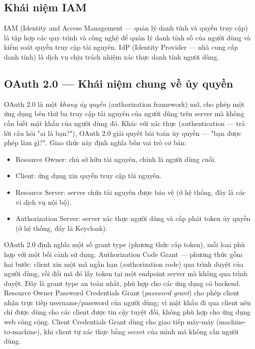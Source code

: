 \documentclass[../BTL.tex]{subfiles}
\begin{document}
\subsection{Khái niệm IAM}
\label{section:2.8.1}

IAM (Identity and Access Management --- quản lý danh tính và quyền truy cập) là tập hợp các quy trình và công nghệ để quản lý danh tính số của người dùng và kiểm soát quyền truy cập tài nguyên. IdP (Identity Provider --- nhà cung cấp danh tính) là dịch vụ chịu trách nhiệm xác thực danh tính người dùng.

\subsection{OAuth 2.0 — Khái niệm chung về ủy quyền}
\label{section:2.8.2}

OAuth 2.0 là một \textit{khung ủy quyền} (authorization framework) mở, cho phép một ứng dụng bên thứ ba truy cập tài nguyên của người dùng trên server mà không cần biết mật khẩu của người dùng đó. Khác với xác thực (authentication — trả lời câu hỏi "ai là bạn?"), OAuth 2.0 giải quyết bài toán ủy quyền — "bạn được phép làm gì?". Giao thức này định nghĩa bốn vai trò cơ bản:

\begin{itemize}
    \item Resource Owner: chủ sở hữu tài nguyên, chính là người dùng cuối.
    \item Client: ứng dụng xin quyền truy cập tài nguyên.
    \item Resource Server: server chứa tài nguyên được bảo vệ (ở hệ thống, đây là các vi dịch vụ nội bộ).
    \item Authorization Server: server xác thực người dùng và cấp phát token ủy quyền (ở hệ thống, đây là Keycloak).
\end{itemize}

OAuth 2.0 định nghĩa một số grant type (phương thức cấp token), mỗi loại phù hợp với một bối cảnh sử dụng. Authorization Code Grant — phương thức gồm hai bước: client xin một mã ngắn hạn (authorization code) qua trình duyệt của người dùng, rồi đổi mã đó lấy token tại một endpoint server mà không qua trình duyệt. Đây là grant type an toàn nhất, phù hợp cho các ứng dụng có backend. Resource Owner Password Credentials Grant (\textit{password grant}) cho phép client nhận trực tiếp username/password của người dùng; vì mật khẩu đi qua client nên chỉ được dùng cho các client được tin cậy tuyệt đối, không phù hợp cho ứng dụng web công cộng. Client Credentials Grant dùng cho giao tiếp máy-máy (machine-to-machine), khi client tự xác thực bằng secret của mình mà không cần người dùng.
\end{document}

